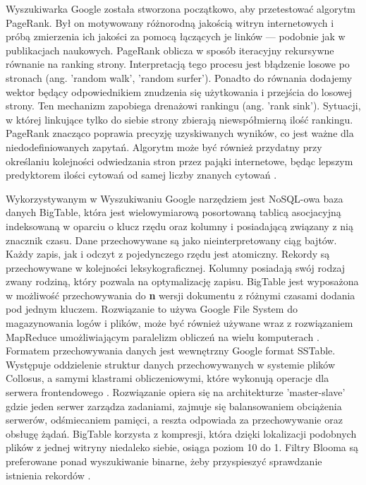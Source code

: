 Wyszukiwarka Google została stworzona początkowo, aby przetestować algorytm PageRank.
Był on motywowany różnorodną jakością witryn internetowych i próbą zmierzenia ich
jakości za pomocą łączących je linków — podobnie jak w publikacjach naukowych. PageRank oblicza
w sposób iteracyjny rekursywne równanie na ranking strony. Interpretacją tego procesu jest błądzenie
losowe po stronach (ang. 'random walk', 'random surfer'). Ponadto do równania dodajemy wektor
będący odpowiednikiem znudzenia się użytkowania i przejścia do losowej strony. Ten mechanizm
zapobiega drenażowi rankingu (ang. 'rank sink'). Sytuacji, w której linkujące tylko do siebie strony zbierają
niewspółmierną ilość rankingu. PageRank znacząco poprawia precyzję uzyskiwanych wyników, co jest
ważne dla niedodefiniowanych zapytań. Algorytm może być również przydatny przy określaniu
kolejności odwiedzania stron przez pająki internetowe, będąc lepszym predyktorem ilości cytowań od
samej liczby znanych cytowań \autocite{pagerank}.\newline

Wykorzystywanym w Wyszukiwaniu Google narzędziem jest NoSQL-owa baza danych BigTable, która jest wielowymiarową posortowaną tablicą asocjacyjną indeksowaną w
oparciu o klucz rzędu oraz kolumny i posiadającą związany z nią znacznik czasu. Dane przechowywane
są jako nieinterpretowany ciąg bajtów. Każdy zapis, jak i odczyt z pojedynczego rzędu jest atomiczny.
Rekordy są przechowywane w kolejności leksykograficznej. Kolumny posiadają swój rodzaj zwany rodziną, który pozwala na
optymalizację zapisu. BigTable jest wyposażona w możliwość przechowywania do {\bf n} wersji
dokumentu z różnymi czasami dodania pod jednym kluczem. Rozwiązanie to używa Google File System
do magazynowania logów i plików, może być również używane wraz z rozwiązaniem MapReduce umożliwiającym
paralelizm obliczeń na wielu komputerach \autocite{bigtable}. Formatem przechowywania danych jest wewnętrzny Google format SSTable. Występuje oddzielenie struktur danych przechowywanych w systemie plików
Collosus, a samymi klastrami obliczeniowymi, które wykonują operacje dla serwera frontendowego \autocite{bigtableoverview}.
Rozwiązanie opiera się na architekturze 'master-slave' gdzie jeden serwer zarządza zadaniami,
zajmuje się balansowaniem obciążenia serwerów, odśmiecaniem pamięci, a reszta odpowiada za
przechowywanie oraz obsługę żądań. BigTable korzysta z kompresji, która dzięki lokalizacji podobnych
plików z jednej witryny niedaleko siebie, osiąga poziom 10 do 1. Filtry Blooma są preferowane ponad
wyszukiwanie binarne, żeby przyspieszyć sprawdzanie istnienia rekordów \autocite{bigtable}.


